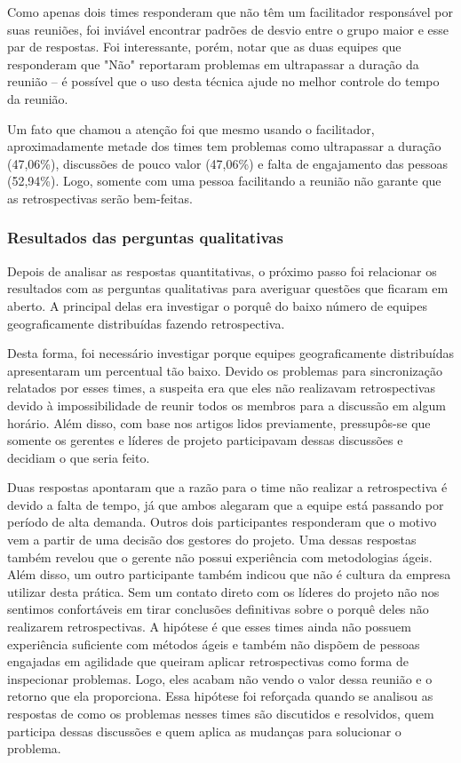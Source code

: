 Como apenas dois times responderam que não têm um facilitador responsável por suas reuniões, foi inviável encontrar padrões de desvio entre o grupo maior e esse par de respostas. Foi interessante, porém, notar que as duas equipes que responderam que "Não" reportaram problemas em ultrapassar a duração da reunião -- é possível que o uso desta técnica ajude no melhor controle do tempo da reunião.

Um fato que chamou a atenção foi que mesmo usando o facilitador, aproximadamente metade dos times tem problemas como ultrapassar a duração (47,06\%), discussões de pouco valor (47,06\%) e falta de engajamento das pessoas (52,94\%). Logo, somente com uma pessoa facilitando a reunião não garante que as retrospectivas serão bem-feitas.

\subsubsection*{Resultados das perguntas qualitativas}

Depois de analisar as respostas quantitativas, o próximo passo foi relacionar os resultados com as perguntas qualitativas para averiguar questões que ficaram em aberto. A principal delas era investigar o porquê do baixo número de equipes geograficamente distribuídas fazendo retrospectiva.
  
Desta forma, foi necessário investigar porque equipes geograficamente distribuídas apresentaram um percentual tão baixo. Devido os problemas para sincronização relatados por esses times, a suspeita era que eles não realizavam retrospectivas devido à impossibilidade de reunir todos os membros para a discussão em algum horário. Além disso, com base nos artigos lidos previamente, pressupôs-se que somente os gerentes e líderes de projeto participavam dessas discussões e decidiam o que seria feito.

Duas respostas apontaram que a razão para o time não realizar a retrospectiva é devido a falta de tempo, já que ambos alegaram que a equipe está passando por período de alta demanda. Outros dois participantes responderam que o motivo vem a partir de uma decisão dos gestores do projeto. Uma dessas respostas também revelou que o gerente não possui experiência com metodologias ágeis. Além disso, um outro participante também indicou que não é cultura da empresa utilizar desta prática. Sem um contato direto com os líderes do projeto não nos sentimos confortáveis em tirar conclusões definitivas sobre o porquê deles não realizarem retrospectivas. A hipótese é que esses times ainda não possuem experiência suficiente com métodos ágeis e também não dispõem de pessoas engajadas em agilidade que queiram aplicar retrospectivas como forma de inspecionar problemas. Logo, eles acabam não vendo o valor dessa reunião e o retorno que ela proporciona. Essa hipótese foi reforçada quando se analisou as respostas de como os problemas nesses times são discutidos e resolvidos, quem participa dessas discussões e quem aplica as mudanças para solucionar o problema.

